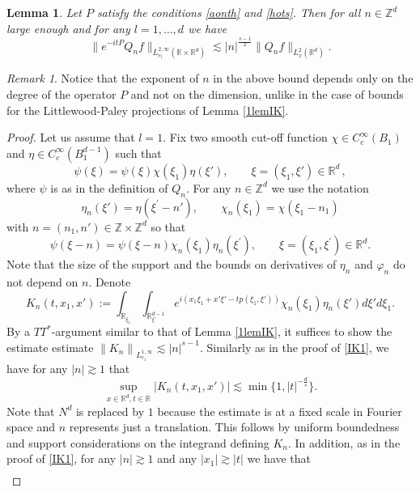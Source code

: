 \documentclass[aihp]{imsart}
\numberwithin{equation}{section}
\theoremstyle{plain}
\newtheorem{lem}[thm]{Lemma}
\theoremstyle{remark}
\newtheorem{rmq}[thm]{Remark}
\newcommand{\R}{\mathbb{R}}
\newcommand{\Z}{\mathbb{Z}}
\begin{document}
\begin{lem}
\label{lemIO}
Let \(P\) satisfy the conditions \eqref{aonth} and \eqref{hots}. Then for all $n\in \Z^d$ large enough and for any $l=1,\ldots ,d$ we have 
\begin{equation*}
\|e^{-it P } Q_n f\|_{L_{e_l}^{2,\infty} (\R \times \R^d)}\lesssim |n|^{\frac{s-1}{2}} \|Q_n f\|_{L_x^2 (\R^d )}.
\end{equation*}
\end{lem}
\begin{rmq}
Notice that the exponent of \(n\) in the above bound depends only on the degree of the operator \(P\) and not on the dimension, unlike in the case of bounds for the Littlewood-Paley projections of Lemma \ref{1lemIK}.
\end{rmq}

\begin{proof}
Let us assume that \(l=1\). Fix two smooth cut-off function $\chi\in C^{\infty}_{c}(B_{1})$ and $\eta\in C^{\infty}_{c}(B_{1}^{d-1})$ such that 
$$\psi (\xi)= \psi (\xi) \chi (\xi_1) \eta (\xi') ,\qquad \xi= (\xi_1 ,\xi') \in \R^d \,,$$
where $\psi$ is as in the definition of $Q_n$. For any $n \in \Z^d$ we use the notation
\begin{equation*}
\eta_{n} (\xi') = \eta (\xi^\prime - n'),\qquad \chi_n (\xi_1) = \chi(\xi_1 - n_{1})
\end{equation*}
with \(n=(n_{1},n')\in\Z\times\Z^{d}\) so that
$$\psi (\xi -n)= \psi (\xi -n) \chi_n (\xi_1) \eta_n (\xi^\prime) ,\qquad \xi= (\xi_1 ,\xi^\prime) \in \R^d .$$
Note that the size of the support and the bounds on derivatives of $\eta_n$ and $\varphi_n$ do not depend on $n$. Denote 
$$
K_n(t,x_1, x') := \int_{\R_{\xi_1} }  \int_{\R_{\xi'}^{d-1} }e^{i (x_1 \xi_1 +x' \xi'-t p(\xi_1 , \xi')  )} \chi_n (\xi_1) \eta_n (\xi' ) d\xi' d \xi_1.
$$
By a $TT^\ast$-argument similar to that of  Lemma \ref{1lemIK}, it suffices to  show the estimate estimate $\left\|K_n\right\|_{L_{e_{1}}^{1,\infty}}\lesssim|n|^{s-1}$. Similarly as in the proof of \eqref{IK1}, we have for any $|n| \gtrsim 1$ that
$$\sup_{x \in \R^{d} ,t\in \R} |K_n (t,x_1, x')| \lesssim \min \{1, |t|^{-\frac{d}{s}}\}. $$
Note that $N^d$ is replaced by $1$ because the estimate is at a fixed scale in Fourier space and $n$ represents just a translation. This follows by uniform boundedness and support considerations on the integrand defining \(K_{n}\). In addition, as in  the proof of \eqref{IK1}, for any $|n| \gtrsim 1$ and any $|x_1| \gtrsim|t|$ we have that
\begin{align*}

\end{align*}
\end{proof}
\end{document}
